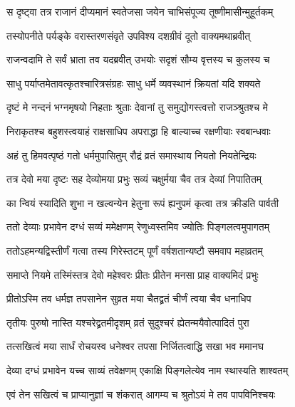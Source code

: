 \twolineshloka
{स दृष्ट्वा तत्र राजानं दीप्यमानं स्वतेजसा}
{जयेन चाभिसंपूज्य तूष्णीमासीन्मुहूर्तकम्} %

\twolineshloka
{तस्योपनीते पर्यङ्के वरास्तरणसंवृते}
{उपविश्य दशग्रीवं दूतो वाक्यमथाब्रवीत्} %

\twolineshloka
{राजन्वदामि ते सर्वं भ्राता तव यदब्रवीत्}
{उभयोः सदृशं सौम्य वृत्तस्य च कुलस्य च} %

\twolineshloka
{साधु पर्याप्तमेतावत्कृतश्चारित्रसंग्रहः}
{साधु धर्मे व्यवस्थानं क्रियतां यदि शक्यते} %

\twolineshloka
{दृष्टं मे नन्दनं भग्नमृषयो निहताः श्रुताः}
{देवानां तु समुद्योगस्त्वत्तो राजञ्श्रुतश्च मे} %

\twolineshloka
{निराकृतश्च बहुशस्त्वयाहं राक्षसाधिप}
{अपराद्धा हि बाल्याच्च रक्षणीयाः स्वबान्धवाः} %

\twolineshloka
{अहं तु हिमवत्पृष्ठं गतो धर्ममुपासितुम्}
{रौद्रं व्रतं समास्थाय नियतो नियतेन्द्रियः} %

\twolineshloka
{तत्र देवो मया दृष्टः सह देव्योमया प्रभुः}
{सव्यं चक्षुर्मया चैव तत्र देव्यां निपातितम्} %

\twolineshloka
{का न्वियं स्यादिति शुभा न खल्वन्येन हेतुना}
{रूपं ह्यनुपमं कृत्वा तत्र क्रीडति पार्वती} %

\twolineshloka
{ततो देव्याः प्रभावेन दग्धं सव्यं ममेक्षणम्}
{रेणुध्वस्तमिव ज्योतिः पिङ्गलत्वमुपागतम्} %

\twolineshloka
{ततोऽहमन्यद्विस्तीर्णं गत्वा तस्य गिरेस्तटम्}
{पूर्णं वर्षशतान्यष्टौ समवाप महाव्रतम्} %

\twolineshloka
{समाप्ते नियमे तस्मिंस्तत्र देवो महेश्वरः}
{प्रीतः प्रीतेन मनसा प्राह वाक्यमिदं प्रभुः} %

\twolineshloka
{प्रीतोऽस्मि तव धर्मज्ञ तपसानेन सुव्रत}
{मया चैतद्व्रतं चीर्णं त्वया चैव धनाधिप} %

\twolineshloka
{तृतीयः पुरुषो नास्ति यश्चरेद्व्रतमीदृशम्}
{व्रतं सुदुश्चरं ह्येतन्मयैवोत्पादितं पुरा} %

\twolineshloka
{तत्सखित्वं मया सार्धं रोचयस्व धनेश्वर}
{तपसा निर्जितत्वाद्धि सखा भव ममानघ} %

\twolineshloka
{देव्या दग्धं प्रभावेन यच्च साव्यं तवेक्षणम्}
{एकाक्षि पिङ्गलेत्येव नाम स्थास्यति शाश्वतम्} %

\twolineshloka
{एवं तेन सखित्वं च प्राप्यानुज्ञां च शंकरात्}
{आगम्य च श्रुतोऽयं मे तव पापविनिश्चयः} %

